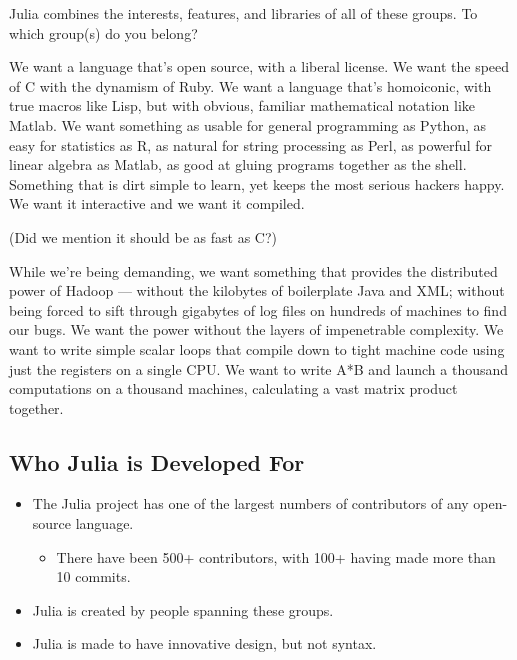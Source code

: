 \documentclass[11pt]{article}
\providecommand{\tightlist}{%
      \setlength{\itemsep}{0pt}\setlength{\parskip}{0pt}}
\begin{document}
Julia combines the interests, features, and libraries of all of these
groups. To which group(s) do you belong?

    We want a language that's open source, with a liberal license. We want
the speed of C with the dynamism of Ruby. We want a language that's
homoiconic, with true macros like Lisp, but with obvious, familiar
mathematical notation like Matlab. We want something as usable for
general programming as Python, as easy for statistics as R, as natural
for string processing as Perl, as powerful for linear algebra as Matlab,
as good at gluing programs together as the shell. Something that is dirt
simple to learn, yet keeps the most serious hackers happy. We want it
interactive and we want it compiled.

(Did we mention it should be as fast as C?)

While we're being demanding, we want something that provides the
distributed power of Hadoop --- without the kilobytes of boilerplate
Java and XML; without being forced to sift through gigabytes of log
files on hundreds of machines to find our bugs. We want the power
without the layers of impenetrable complexity. We want to write simple
scalar loops that compile down to tight machine code using just the
registers on a single CPU. We want to write A*B and launch a thousand
computations on a thousand machines, calculating a vast matrix product
together.

    \hypertarget{who-julia-is-developed-for}{%
\subsection{Who Julia is Developed
For}\label{who-julia-is-developed-for}}

\begin{itemize}
\tightlist
\item
  The Julia project has one of the largest numbers of contributors of
  any open-source language.

  \begin{itemize}
  \tightlist
  \item
    There have been 500+ contributors, with 100+ having made more than
    10 commits.
  \end{itemize}
\item
  Julia is created by people spanning these groups.
\item
  Julia is made to have innovative design, but not syntax.
\end{itemize}
\end{document}
